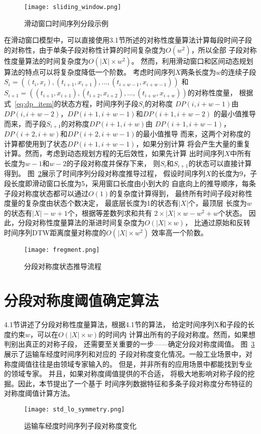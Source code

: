 \begin{figure}
  \centering
  \texttt{[image: sliding\_window.png]}
  \caption{滑动窗口时间序列分段示例}
  \label{fig:sliding_window}
\end{figure}

在滑动窗口模型中，可以直接使用3.1节所述的对称性度量算法计算每段时间子段
的对称性，由于单条子段对称性计算的时间复杂度为$O(w^2 )$，所以全部
子段对称性度量算法的时间复杂度为$O\left(|X| \times w^{2}\right)$。
然而，利用滑动窗口和区间动态规划算法的特点可以将复杂度降低一个阶数。
考虑时间序列$X$两条长度为$w$的连续子段$S_{i}=\left(\left(t_{i}, x_{i}\right),\left(t_{i+1}, x_{i+1}\right), \dots,\left(t_{i+w-1}, x_{i+w-1}\right)\right)$
和$S_{i+1}=\left(\left(t_{i+1}, x_{i+1}\right),\left(t_{i+2}, x_{i+2}\right), \dots,\left(t_{i+w}, x_{i+w}\right)\right)$的对称性度量，
根据式~\ref{eq:dp_item}的状态方程，时间序列子段$S_i$的对称度
$D P(i, i+w-1)$由$DP(i,i+w-2)$，$DP(i+1,i+w-1)$和$DP(i+1,i+w-2)$
的最小值推导而来，而子段$S_{i+1}$的对称度$D P(i+1, i+w)$由
$D P(i+1, i+w-1)$，$DP(i+2,i+w)$和$DP(i+2,i+w-1)$的最小值推导
而来，这两个对称度的计算都使用到了状态$DP(i+1,i+w-1)$，如果分别计算
将会产生大量的重复计算。然而，考虑到动态规划方程的无后效性，如果先计算
出时间序列$X$中所有长度为$w-1$和$w-2$的子段对称度并保存下来，
则$S_i$和$S_{i+1}$的状态可以直接计算得到。
图~\ref{fig:fregment}展示了时间序列分段对称度推导过程，
假设时间序列$X$的长度为9，子段长度即滑动窗口长度为5，采用窗口长度由小到大的
自底向上的推导顺序，每条子段对称度状态都可以通过$O(1)$的复杂度计算得到，
最终所有时间子段对称性度量的复杂度由状态个数决定，
最底层长度为1的状态有$|X|$个，最顶层
长度为$w$的状态有$|X|-w+1$个，根据等差数列求和共有
$2 \times|X| \times w-w^{2}+w$个状态。
因此，分段对称性度量算法的渐进时间复杂度为$O(|X| \times w)$，
比通过原始和反转时间序列DTW距离度量对称度的$O\left(|X| \times w^{2}\right)$
效率高一个阶数。
\begin{figure}
  \centering
  \texttt{[image: fregment.png]}
  \caption{分段对称度状态推导流程}
  \label{fig:fregment}
\end{figure}

\section{分段对称度阈值确定算法}

4.1节讲述了分段对称性度量算法，根据4.1节的算法，
给定时间序列X和子段的长度约束$w$，可以在$O(|X| \times w)$的时间内
计算出所有的子段对称度。然而，如果想判别出真正的对称子段，
还需要至关重要的一步——确定分段对称度阈值。
图~\ref{fig:lontitude_symmetry}展示了运输车经度时间序列和对应的
子段对称度变化情况。一般工业场景中，对称度阈值往往是由领域专家输入的。
但是，并非所有的应用场景中都能找到专业的领域专家。
并且，如果对称度阈值提供的不合适，
将极大地影响对称子段的挖掘。因此，本节提出了一个基于
时间序列数据特征和多条子段对称度分布特征的对称度阈值计算方法。
\begin{figure}
  \centering
  \texttt{[image: std\_lo\_symmetry.png]}
  \caption{运输车经度时间序列子段对称度变化}
  \label{fig:lontitude_symmetry}
\end{figure}

